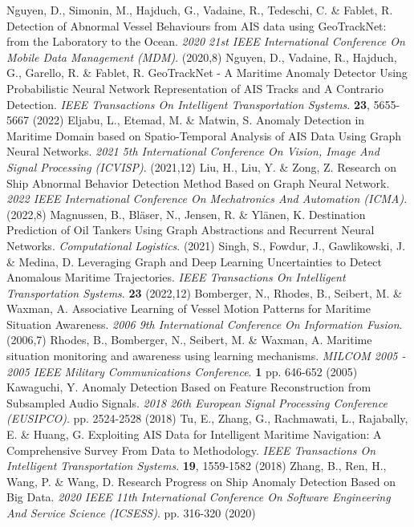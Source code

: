Nguyen, D., Simonin, M., Hajduch, G., Vadaine, R., Tedeschi, C. \& Fablet, R. Detection of Abnormal Vessel Behaviours from AIS data using GeoTrackNet: from the Laboratory to the Ocean. {\em 2020 21st IEEE International Conference On Mobile Data Management (MDM)}. (2020,8)
Nguyen, D., Vadaine, R., Hajduch, G., Garello, R. \& Fablet, R. GeoTrackNet - A Maritime Anomaly Detector Using Probabilistic Neural Network Representation of AIS Tracks and A Contrario Detection. {\em IEEE Transactions On Intelligent Transportation Systems}. \textbf{23}, 5655-5667 (2022)
Eljabu, L., Etemad, M. \& Matwin, S. Anomaly Detection in Maritime Domain based on Spatio-Temporal Analysis of AIS Data Using Graph Neural Networks. {\em 2021 5th International Conference On Vision, Image And Signal Processing (ICVISP)}. (2021,12)
Liu, H., Liu, Y. \& Zong, Z. Research on Ship Abnormal Behavior Detection Method Based on Graph Neural Network. {\em 2022 IEEE International Conference On Mechatronics And Automation (ICMA)}. (2022,8)
Magnussen, B., Bläser, N., Jensen, R. \& Ylänen, K. Destination Prediction of Oil Tankers Using Graph Abstractions and Recurrent Neural Networks. {\em Computational Logistics}. (2021)
Singh, S., Fowdur, J., Gawlikowski, J. \& Medina, D. Leveraging Graph and Deep Learning Uncertainties to Detect Anomalous Maritime Trajectories. {\em IEEE Transactions On Intelligent Transportation Systems}. \textbf{23} (2022,12)
Bomberger, N., Rhodes, B., Seibert, M. \& Waxman, A. Associative Learning of Vessel Motion Patterns for Maritime Situation Awareness. {\em 2006 9th International Conference On Information Fusion}. (2006,7)
Rhodes, B., Bomberger, N., Seibert, M. \& Waxman, A. Maritime situation monitoring and awareness using learning mechanisms. {\em MILCOM 2005 - 2005 IEEE Military Communications Conference}. \textbf{1} pp. 646-652 (2005)
Kawaguchi, Y. Anomaly Detection Based on Feature Reconstruction from Subsampled Audio Signals. {\em 2018 26th European Signal Processing Conference (EUSIPCO)}. pp. 2524-2528 (2018)
Tu, E., Zhang, G., Rachmawati, L., Rajabally, E. \& Huang, G. Exploiting AIS Data for Intelligent Maritime Navigation: A Comprehensive Survey From Data to Methodology. {\em IEEE Transactions On Intelligent Transportation Systems}. \textbf{19}, 1559-1582 (2018)
Zhang, B., Ren, H., Wang, P. \& Wang, D. Research Progress on Ship Anomaly Detection Based on Big Data. {\em 2020 IEEE 11th International Conference On Software Engineering And Service Science (ICSESS)}. pp. 316-320 (2020)
